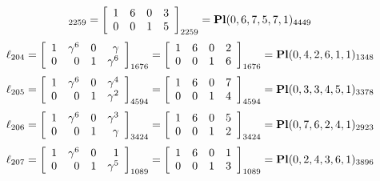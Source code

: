 \documentclass{article}
\begin{document}
{$$_{2259}
=
\left[
\begin{array}{*{4}c}
1  & 6  & 0  & 3\\
0  & 0  & 1  & 5\\
\end{array}
\right]_{2259}
={\rm\bf Pl}(0,6,7,5,7,1 )_{4449}$$
$$
\ell_{204} = 
\left[
\begin{array}{*{4}{r}}
1 & \gamma^{6} & 0 & \gamma \\
0 & 0 & 1 & \gamma^{6}\\
\end{array}
\right]
_{1676}
=
\left[
\begin{array}{*{4}c}
1  & 6  & 0  & 2\\
0  & 0  & 1  & 6\\
\end{array}
\right]_{1676}
={\rm\bf Pl}(0,4,2,6,1,1 )_{1348}$$
$$
\ell_{205} = 
\left[
\begin{array}{*{4}{r}}
1 & \gamma^{6} & 0 & \gamma^{4}\\
0 & 0 & 1 & \gamma^{2}\\
\end{array}
\right]
_{4594}
=
\left[
\begin{array}{*{4}c}
1  & 6  & 0  & 7\\
0  & 0  & 1  & 4\\
\end{array}
\right]_{4594}
={\rm\bf Pl}(0,3,3,4,5,1 )_{3378}$$
$$
\ell_{206} = 
\left[
\begin{array}{*{4}{r}}
1 & \gamma^{6} & 0 & \gamma^{3}\\
0 & 0 & 1 & \gamma \\
\end{array}
\right]
_{3424}
=
\left[
\begin{array}{*{4}c}
1  & 6  & 0  & 5\\
0  & 0  & 1  & 2\\
\end{array}
\right]_{3424}
={\rm\bf Pl}(0,7,6,2,4,1 )_{2923}$$
$$
\ell_{207} = 
\left[
\begin{array}{*{4}{r}}
1 & \gamma^{6} & 0 & 1\\
0 & 0 & 1 & \gamma^{5}\\
\end{array}
\right]
_{1089}
=
\left[
\begin{array}{*{4}c}
1  & 6  & 0  & 1\\
0  & 0  & 1  & 3\\
\end{array}
\right]_{1089}
={\rm\bf Pl}(0,2,4,3,6,1 )_{3896}$$
}
\end{document}
